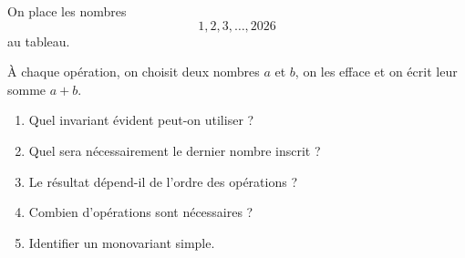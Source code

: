 On place les nombres
\[
1, 2, 3, \ldots, 2026
\]
au tableau.

À chaque opération, on choisit deux nombres $a$ et $b$, on les efface et on
écrit leur somme $a + b$.
\begin{enumerate}
  \item Quel invariant évident peut-on utiliser ?
  \item Quel sera nécessairement le dernier nombre inscrit ?
  \item Le résultat dépend-il de l'ordre des opérations ?
  \item Combien d'opérations sont nécessaires ?
  \item Identifier un monovariant simple.
\end{enumerate}
